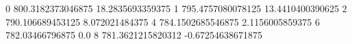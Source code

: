0 800.3182373046875 18.2835693359375
1 795.4757080078125 13.4410400390625
2 790.106689453125 8.072021484375
4 784.1502685546875 2.1156005859375
6 782.03466796875 0.0
8 781.3621215820312 -0.67254638671875

